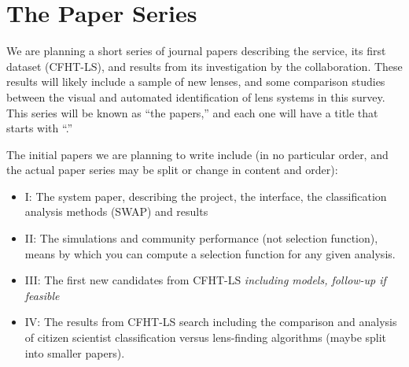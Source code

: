 \documentclass[a4paper]{article}
\begin{document}




\section{The \SW Paper Series}
\label{sec:series}

We are planning a short series of journal papers describing the \sw service,
its first dataset (CFHT-LS), and results from its investigation by the
collaboration. These results will likely include a sample of new lenses, and
some comparison studies between the visual and automated identification of
lens systems in this survey. This series will be known as ``the \sw papers,''
and each one will have a title that starts with ``\sw.''

The initial papers we are planning to write include (in no particular order,
and the actual paper series may be split or change in content and order):

\begin{itemize}
\item \sw I: The system paper, describing the project, the interface, the
classification analysis methods (SWAP) and results 
\item \sw II: The \sw  simulations and community performance (not selection
function), means by which you can compute a selection function for any given
analysis. 
\item \sw III: The first new candidates from CFHT-LS \textit{including models,
follow-up if feasible}
\item \sw IV: The results from CFHT-LS search including the comparison and
analysis of citizen scientist classification versus lens-finding algorithms
(maybe split into smaller papers).
\end{itemize}
\end{document}
